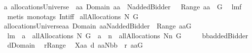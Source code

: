\begin{isabellebody}
{\isacharparenleft}a{\isasymin}\ {\isacharparenleft}allocationsUniverse\ {\isasyminter}\ {\isacharbraceleft}aa{\isachardot}\ Domain\ aa\ {\isasymsubseteq}\ N{\isacharminus}{\isacharbraceleft}addedBidder{\isacharprime}{\isacharbraceright}\ {\isacharampersand}\ {\isasymUnion}\ Range\ aa\ {\isasymsubseteq}\ G{\isacharbraceright}{\isacharparenright}{\isacharparenright}{\isachardoublequoteclose}\ \isanewline
%
\isadelimproof
%
\endisadelimproof
%
\isatagproof
{}\isamarkupfalse%
\ lm{}{}f\ \isamarkupfalse%
\ {\isacharparenleft}metis\ {\isacharparenleft}mono{\isacharunderscore}tags{\isacharparenright}\ Int{\isacharunderscore}iff{\isacharparenright}%
\endisatagproof
{\isafoldproof}%
%
\isadelimproof
\isanewline
%
\endisadelimproof
\isanewline
{}\isamarkupfalse%
\ {\isachardoublequoteopen}allAllocations{\isacharprime}{\isacharprime}{\isacharprime}{\isacharprime}\ N\ G\ {\isacharequal}{\isacharequal}\ \isanewline
allocationsUniverse{\isasyminter}{\isacharbraceleft}aa{\isachardot}\ Domain\ aa{\isasymsubseteq}N{\isacharminus}{\isacharbraceleft}addedBidder{\isacharprime}{\isacharbraceright}\ {\isacharampersand}\ {\isasymUnion}Range\ aa{\isasymsubseteq}G{\isacharbraceright}{\isachardoublequoteclose}\isanewline
\isanewline
{}\isamarkupfalse%
\ lm{}{}{\isacharcolon}\ \ {\isachardoublequoteopen}a\ {\isasymin}\ allAllocations{\isacharprime}{\isacharprime}{\isacharprime}{\isacharprime}\ N\ G{\isachardoublequoteclose}\ \ {\isachardoublequoteopen}a\ {\isacharminus}{\isacharminus}\ n\ {\isasymin}\ allAllocations{\isacharprime}{\isacharprime}{\isacharprime}{\isacharprime}\ {\isacharparenleft}N{\isacharminus}{\isacharbraceleft}n{\isacharbraceright}{\isacharparenright}\ G{\isachardoublequoteclose}\isanewline
%
\isadelimproof
%
\endisadelimproof
%
\isatagproof
{}\isamarkupfalse%
\ {\isacharminus}\isanewline
\ \ \isamarkupfalse%
\ {\isacharquery}bb{\isacharequal}addedBidder{\isacharprime}\ \isamarkupfalse%
\ {\isacharquery}d{\isacharequal}Domain\ \isamarkupfalse%
\ {\isacharquery}r{\isacharequal}Range\ \isamarkupfalse%
\ {\isacharquery}X{}{\isacharequal}{\isachardoublequoteopen}{\isacharbraceleft}aa{\isachardot}\ {\isacharquery}d\ aa{\isasymsubseteq}N{\isacharminus}{\isacharbraceleft}{\isacharquery}bb{\isacharbraceright}\ {\isacharampersand}\ {\isasymUnion}{\isacharquery}r\ aa{\isasymsubseteq}G{\isacharbraceright}{\isachardoublequoteclose}\ \isanewline

\end{isabellebody}
